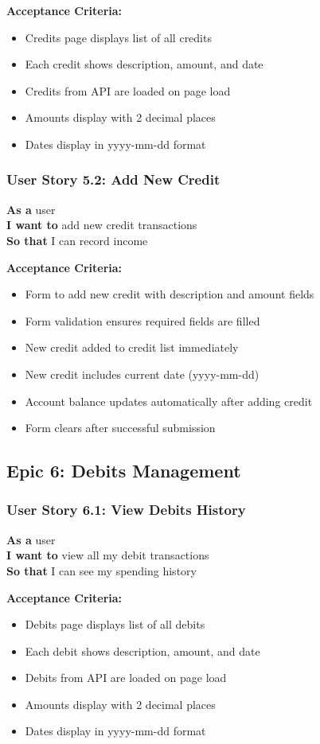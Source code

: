 \documentclass[11pt,a4paper]{article}
\begin{document}
\textbf{Acceptance Criteria:}
\begin{itemize}[leftmargin=*]
    \item Credits page displays list of all credits
    \item Each credit shows description, amount, and date
    \item Credits from API are loaded on page load
    \item Amounts display with 2 decimal places
    \item Dates display in yyyy-mm-dd format
\end{itemize}

\subsubsection{User Story 5.2: Add New Credit}
\textbf{As a} user\\
\textbf{I want to} add new credit transactions\\
\textbf{So that} I can record income

\textbf{Acceptance Criteria:}
\begin{itemize}[leftmargin=*]
    \item Form to add new credit with description and amount fields
    \item Form validation ensures required fields are filled
    \item New credit added to credit list immediately
    \item New credit includes current date (yyyy-mm-dd)
    \item Account balance updates automatically after adding credit
    \item Form clears after successful submission
\end{itemize}

\subsection{Epic 6: Debits Management}

\subsubsection{User Story 6.1: View Debits History}
\textbf{As a} user\\
\textbf{I want to} view all my debit transactions\\
\textbf{So that} I can see my spending history

\textbf{Acceptance Criteria:}
\begin{itemize}[leftmargin=*]
    \item Debits page displays list of all debits
    \item Each debit shows description, amount, and date
    \item Debits from API are loaded on page load
    \item Amounts display with 2 decimal places
    \item Dates display in yyyy-mm-dd format
\end{itemize}
\end{document}
